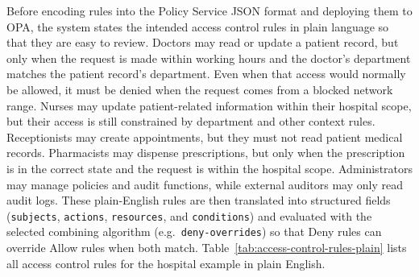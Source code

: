 Before encoding rules into the Policy Service JSON format and deploying them to OPA, the system states the intended access
control rules in plain language so that they are easy to review. Doctors may read or update a patient record, but only when
the request is made within working hours and the doctor’s department matches the patient record’s department. Even when
that access would normally be allowed, it must be denied when the request comes from a blocked network range. Nurses may
update patient-related information within their hospital scope, but their access is still constrained by department and
other context rules. Receptionists may create appointments, but they must not read patient medical records. Pharmacists may
dispense prescriptions, but only when the prescription is in the correct state and the request is within the hospital
scope. Administrators may manage policies and audit functions, while external auditors may only read audit logs. These
plain-English rules are then translated into structured fields (\texttt{subjects}, \texttt{actions}, \texttt{resources}, and
\texttt{conditions}) and evaluated with the selected combining algorithm (e.g.\ \texttt{deny-overrides}) so that Deny rules
can override Allow rules when both match. Table~\ref{tab:access-control-rules-plain} lists all access control rules for the hospital example in plain English.

